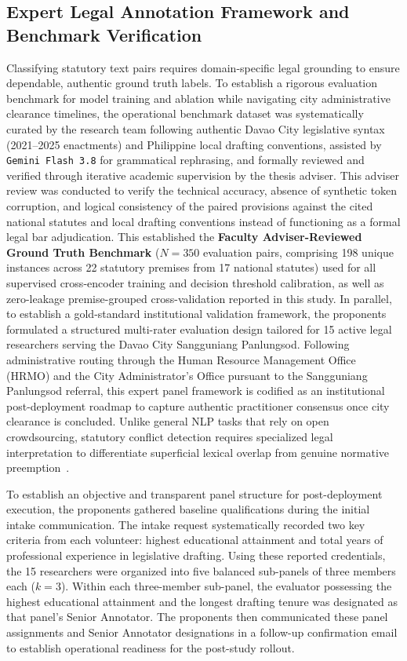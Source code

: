     \subsection{Expert Legal Annotation Framework and Benchmark Verification}
    \label{sec:annotation_panel}
    Classifying statutory text pairs requires domain-specific legal grounding to ensure dependable, authentic ground truth labels. To establish a rigorous evaluation benchmark for model training and ablation while navigating city administrative clearance timelines, the operational benchmark dataset was systematically curated by the research team following authentic Davao City legislative syntax (2021--2025 enactments) and Philippine local drafting conventions, assisted by \texttt{Gemini Flash 3.8} for grammatical rephrasing, and formally reviewed and verified through iterative academic supervision by the thesis adviser. This adviser review was conducted to verify the technical accuracy, absence of synthetic token corruption, and logical consistency of the paired provisions against the cited national statutes and local drafting conventions instead of functioning as a formal legal bar adjudication. This established the \textbf{Faculty Adviser-Reviewed Ground Truth Benchmark} ($N = 350$ evaluation pairs, comprising 198 unique instances across 22 statutory premises from 17 national statutes) used for all supervised cross-encoder training and decision threshold calibration, as well as zero-leakage premise-grouped cross-validation reported in this study. In parallel, to establish a gold-standard institutional validation framework, the proponents formulated a structured multi-rater evaluation design tailored for 15 active legal researchers serving the Davao City Sangguniang Panlungsod. Following administrative routing through the Human Resource Management Office (HRMO) and the City Administrator's Office pursuant to the Sangguniang Panlungsod referral, this expert panel framework is codified as an institutional post-deployment roadmap to capture authentic practitioner consensus once city clearance is concluded. Unlike general NLP tasks that rely on open crowdsourcing, statutory conflict detection requires specialized legal interpretation to differentiate superficial lexical overlap from genuine normative preemption~\cite{snow2008cheap, zheng2021when, chalkidis2022lexglue}.

    To establish an objective and transparent panel structure for post-deployment execution, the proponents gathered baseline qualifications during the initial intake communication. The intake request systematically recorded two key criteria from each volunteer: highest educational attainment and total years of professional experience in legislative drafting. Using these reported credentials, the 15 researchers were organized into five balanced sub-panels of three members each ($k = 3$). Within each three-member sub-panel, the evaluator possessing the highest educational attainment and the longest drafting tenure was designated as that panel's Senior Annotator. The proponents then communicated these panel assignments and Senior Annotator designations in a follow-up confirmation email to establish operational readiness for the post-study rollout.

